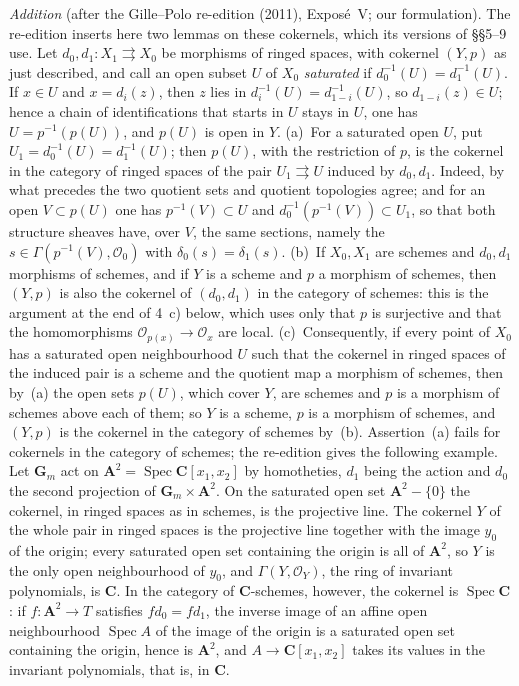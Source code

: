 \par\medskip\noindent
\emph{Addition} (after the Gille--Polo re-edition (2011), Exposé~V; our
formulation). The re-edition inserts here two lemmas on these cokernels,
which its versions of \S\S5--9 use. Let \(d_0,d_1\colon X_1\rightrightarrows
X_0\) be morphisms of ringed spaces, with cokernel \((Y,p)\) as just
described, and call an open subset \(U\) of \(X_0\) \emph{saturated} if
\(d_0^{-1}(U)=d_1^{-1}(U)\). If \(x\in U\) and \(x=d_i(z)\), then \(z\) lies
in \(d_i^{-1}(U)=d_{1-i}^{-1}(U)\), so \(d_{1-i}(z)\in U\); hence a chain of
identifications that starts in \(U\) stays in \(U\), one has
\(U=p^{-1}(p(U))\), and \(p(U)\) is open in \(Y\). (a)~For a saturated open
\(U\), put \(U_1=d_0^{-1}(U)=d_1^{-1}(U)\); then \(p(U)\), with the
restriction of \(p\), is the cokernel in the category of ringed spaces of
the pair \(U_1\rightrightarrows U\) induced by \(d_0,d_1\). Indeed, by what
precedes the two quotient sets and quotient topologies agree; and for an
open \(V\subset p(U)\) one has \(p^{-1}(V)\subset U\) and
\(d_0^{-1}(p^{-1}(V))\subset U_1\), so that both structure sheaves have, over
\(V\), the same sections, namely the \(s\in\Gamma(p^{-1}(V),\mathcal O_0)\)
with \(\delta_0(s)=\delta_1(s)\). (b)~If \(X_0,X_1\) are schemes and
\(d_0,d_1\) morphisms of schemes, and if \(Y\) is a scheme and \(p\) a
morphism of schemes, then \((Y,p)\) is also the cokernel of \((d_0,d_1)\) in
the category of schemes: this is the argument at the end of 4~c) below,
which uses only that \(p\) is surjective and that the homomorphisms
\(\mathcal O_{p(x)}\to\mathcal O_x\) are local. (c)~Consequently, if every
point of \(X_0\) has a saturated open neighbourhood \(U\) such that the
cokernel in ringed spaces of the induced pair is a scheme and the quotient
map a morphism of schemes, then by~(a) the open sets \(p(U)\), which cover
\(Y\), are schemes and \(p\) is a morphism of schemes above each of them;
so \(Y\) is a scheme, \(p\) is a morphism of schemes, and \((Y,p)\) is the
cokernel in the category of schemes by~(b). Assertion~(a) fails for
cokernels in the category of schemes; the re-edition gives the following
example. Let \(\mathbf G_m\) act on
\(\mathbf A^2=\operatorname{Spec}\mathbf C[x_1,x_2]\) by homotheties,
\(d_1\) being the action and \(d_0\) the second projection of
\(\mathbf G_m\times\mathbf A^2\). On the saturated open set
\(\mathbf A^2-\{0\}\) the cokernel, in ringed spaces as in schemes, is the
projective line. The cokernel \(Y\) of the whole pair in ringed spaces is
the projective line together with the image \(y_0\) of the origin; every
saturated open set containing the origin is all of \(\mathbf A^2\), so
\(Y\) is the only open neighbourhood of \(y_0\), and
\(\Gamma(Y,\mathcal O_Y)\), the ring of invariant polynomials, is
\(\mathbf C\). In the category of \(\mathbf C\)-schemes, however, the
cokernel is \(\operatorname{Spec}\mathbf C\): if
\(f\colon\mathbf A^2\to T\) satisfies \(fd_0=fd_1\), the inverse image of an
affine open neighbourhood \(\operatorname{Spec}A\) of the image of the
origin is a saturated open set containing the origin, hence is
\(\mathbf A^2\), and \(A\to\mathbf C[x_1,x_2]\) takes its values in the
invariant polynomials, that is, in \(\mathbf C\).
\par\medskip
